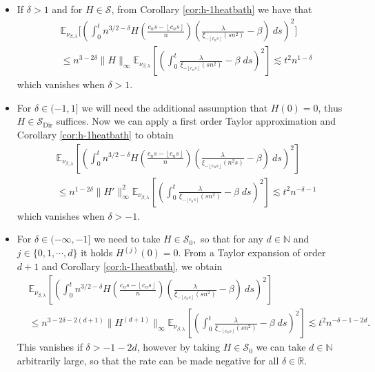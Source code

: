 \documentclass[a4paper, reqno, 12pt]{amsart}
\theoremstyle{plain}
\theoremstyle{definition}
\newcommand{\floor}[1]{\left\lfloor #1 \right\rfloor}
\newcommand{\parent}[1]{\left( #1 \right)}
\newcommand{\ee}[1]{\mathbb{E}_{\nu_{\beta,\lambda}}\left[ #1 \right]}
\newcommand{\R}{\mathbb{R}}
\newcommand{\N}{\mathbb{N}}
\newcommand{\Sdir}{\mathcal{S}_{\text{Dir}}}
\begin{document}
\begin{itemize}
\item If $\delta>1$ and for $H\in\mathcal S $, from  Corollary \ref{cor:h-1heatbath} we have that
\begin{equation}
\begin{split}
&\mathbb E_{\nu_{\beta,\lambda}}\Bigg[ \left(\int_0^t n^{3/2-\delta} H\parent{\frac{c_ns-\floor{c_ns}}{n}}  \parent{\frac{\lambda}{\xi_{-\floor{c_n s}}(sn^2)} -\beta} \ ds \right)^2\Bigg] \\ 
&  \leq n^{3-2\delta}\|H\|_{\infty} \ee{ \parent{ \int_0^t \frac{\lambda}{\xi_{-\floor{c_n s}}(sn^2)} -\beta \; ds }^2 } \lesssim t^2 n^{1 -\delta}
\end{split}
\end{equation}
which vanishes when $\delta>1$.
\item For $\delta\in(-1,1]$ we will need the additional assumption that $H(0) = 0$, thus $H\in\Sdir$ suffices.
Now we can apply a first order Taylor approximation and  Corollary \ref{cor:h-1heatbath} to obtain
\begin{equation}
\begin{split}
&\ee{ \parent{\int_0^t n^{3/2-\delta} H\parent{\frac{c_ns-\floor{c_ns}}{n}}  \parent{\frac{\lambda}{\xi_{-\floor{c_n s}}(n^2s)} -\beta} \ ds }^2} \\ 
&  \leq n^{1-2\delta}\|H'\|_{\infty}^2 \ee{ \parent{ \int_0^t \frac{\lambda}{\xi_{-\floor{c_n s}}(sn^2)} -\beta \; ds }^2 } \lesssim t^2 n^{-\delta-1}
\end{split}
\end{equation}
which vanishes when $\delta>-1$.
\item For $\delta\in(-\infty,-1]$ we need to take $ H\in\mathcal{S}_{0},$ so that for any $d\in\mathbb{N}$ and  $j\in\{0,1,\cdots,d\}$ it holds $H^{(j)}(0) = 0$. From a Taylor expansion of order $d+1$ and  Corollary \ref{cor:h-1heatbath}, we obtain
\begin{equation}
\begin{split}
&\ee{ \parent{\int_0^t n^{3/2-\delta} H\parent{\frac{c_ns-\floor{c_ns}}{n}}  \parent{\frac{\lambda}{\xi_{-\floor{c_n s}}(sn^2)} -\beta} \ ds }^2} \\ 
&  \leq n^{3-2\delta-2(d+1)}\|H^{(d+1)}\|_{\infty} \ee{ \parent{ \int_0^t \frac{\lambda}{\xi_{-\floor{c_n s}}(sn^2)} -\beta \; ds }^2 } \lesssim t^2 n^{ -\delta-1-2d}.
\end{split}
\end{equation}
This vanishes  if $\delta>-1-2d$, however by taking $H\in\mathcal{S}_0$ we can take $d\in\N$ arbitrarily large, so that the rate can be made negative for all $\delta\in\R$.
\end{itemize}
  \medskip 
  
\end{document}
